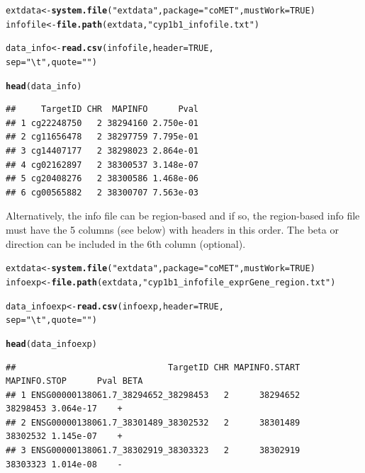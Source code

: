 \documentclass[11pt]{article}\usepackage[]{graphicx}\usepackage[usenames,dvipsnames]{color}
\makeatletter
\newcommand{\hlnum}[1]{\textcolor[rgb]{0.686,0.059,0.569}{#1}}%
\newcommand{\hlstr}[1]{\textcolor[rgb]{0.192,0.494,0.8}{#1}}%
\newcommand{\hlstd}[1]{\textcolor[rgb]{0.345,0.345,0.345}{#1}}%
\newcommand{\hlkwb}[1]{\textcolor[rgb]{0.69,0.353,0.396}{#1}}%
\newcommand{\hlkwc}[1]{\textcolor[rgb]{0.333,0.667,0.333}{#1}}%
\newcommand{\hlkwd}[1]{\textcolor[rgb]{0.737,0.353,0.396}{\textbf{#1}}}%
\newenvironment{kframe}{%
 \def\at@end@of@kframe{}%
 \ifinner\ifhmode%
  \def\at@end@of@kframe{\end{minipage}}%
  \begin{minipage}{\columnwidth}%
 \fi\fi%
 \def\FrameCommand##1{\hskip\@totalleftmargin \hskip-\fboxsep
 \colorbox{shadecolor}{##1}\hskip-\fboxsep
     \hskip-\linewidth \hskip-\@totalleftmargin \hskip\columnwidth}%
 \MakeFramed {\advance\hsize-\width
   \@totalleftmargin\z@ \linewidth\hsize
   \@setminipage}}%
 {\par\unskip\endMakeFramed%
 \at@end@of@kframe}
\newenvironment{knitrout}{}{} %
\makeatother
\begin{document}
\begin{knitrout}
\color{fgcolor}\begin{kframe}
\begin{alltt}
\hlstd{extdata} \hlkwb{<-} \hlkwd{system.file}\hlstd{(}\hlstr{"extdata"}\hlstd{,} \hlkwc{package}\hlstd{=}\hlstr{"coMET"}\hlstd{,}\hlkwc{mustWork}\hlstd{=}\hlnum{TRUE}\hlstd{)}
\hlstd{infofile} \hlkwb{<-} \hlkwd{file.path}\hlstd{(extdata,} \hlstr{"cyp1b1_infofile.txt"}\hlstd{)}

\hlstd{data_info} \hlkwb{<-}\hlkwd{read.csv}\hlstd{(infofile,} \hlkwc{header} \hlstd{=} \hlnum{TRUE}\hlstd{,}
                     \hlkwc{sep} \hlstd{=} \hlstr{"\textbackslash{}t"}\hlstd{,} \hlkwc{quote} \hlstd{=} \hlstr{""}\hlstd{)}

\hlkwd{head}\hlstd{(data_info)}
\end{alltt}
\begin{verbatim}
##     TargetID CHR  MAPINFO      Pval
## 1 cg22248750   2 38294160 2.750e-01
## 2 cg11656478   2 38297759 7.795e-01
## 3 cg14407177   2 38298023 2.864e-01
## 4 cg02162897   2 38300537 3.148e-07
## 5 cg20408276   2 38300586 1.468e-06
## 6 cg00565882   2 38300707 7.563e-03
\end{verbatim}
\end{kframe}
\end{knitrout}

Alternatively, the info file can be region-based and if so, the region-based info file must have the 5 columns (see below) with headers in this order. The beta or direction can be included in the 6th column (optional).

\begin{knitrout}
\color{fgcolor}\begin{kframe}
\begin{alltt}
\hlstd{extdata} \hlkwb{<-} \hlkwd{system.file}\hlstd{(}\hlstr{"extdata"}\hlstd{,} \hlkwc{package}\hlstd{=}\hlstr{"coMET"}\hlstd{,}\hlkwc{mustWork}\hlstd{=}\hlnum{TRUE}\hlstd{)}
\hlstd{infoexp} \hlkwb{<-} \hlkwd{file.path}\hlstd{(extdata,} \hlstr{"cyp1b1_infofile_exprGene_region.txt"}\hlstd{)}

\hlstd{data_infoexp} \hlkwb{<-}\hlkwd{read.csv}\hlstd{(infoexp,} \hlkwc{header} \hlstd{=} \hlnum{TRUE}\hlstd{,}
                        \hlkwc{sep} \hlstd{=} \hlstr{"\textbackslash{}t"}\hlstd{,} \hlkwc{quote} \hlstd{=} \hlstr{""}\hlstd{)}

\hlkwd{head}\hlstd{(data_infoexp)}
\end{alltt}
\begin{verbatim}
##                              TargetID CHR MAPINFO.START MAPINFO.STOP      Pval BETA
## 1 ENSG00000138061.7_38294652_38298453   2      38294652     38298453 3.064e-17    +
## 2 ENSG00000138061.7_38301489_38302532   2      38301489     38302532 1.145e-07    +
## 3 ENSG00000138061.7_38302919_38303323   2      38302919     38303323 1.014e-08    -
\end{verbatim}
\end{kframe}
\end{knitrout}
\end{document}

